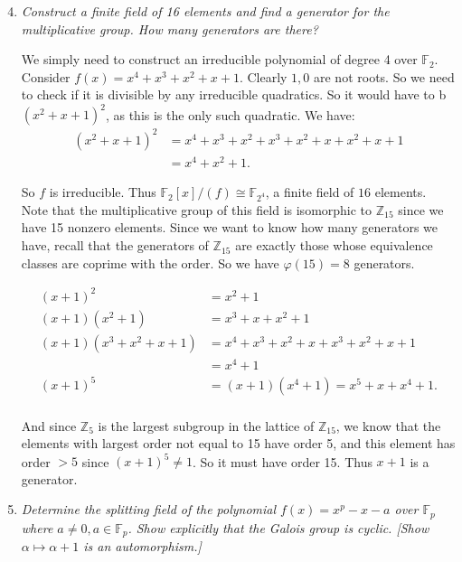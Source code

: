 \documentclass[9pt,reqno,twoside]{amsbook}
\theoremstyle{plain}
\numberwithin{section}{chapter}
\numberwithin{equation}{chapter}
\theoremstyle{definition}
\theoremstyle{remark}
\theoremstyle{plain}
\newcommand{\z}{\mathbb{Z}}
\newcommand{\F}{\mathbb{F}}
\newcommand{\bee}{\begin{equation}\begin{aligned}}
\newcommand{\eee}{\end{aligned}\end{equation}}
\newcommand{\counter}{\setcounter}
\renewcommand{\phi}{\varphi}
\begin{document}
\begin{enumerate}[label=\arabic*.]
\counter{enumi}{3}

\item \textit{Construct a finite field of 16 elements and find a generator for the multiplicative group. How many generators are there?}

We simply need to construct an irreducible polynomial of degree 4 over $\F_2$. Consider $f(x) = x^4 + x^3 + x^2 + x + 1$. Clearly $1,0$ are not roots. So we need to check if it is divisible by any irreducible quadratics. So it would have to b $(x^2 + x + 1)^2$, as this is the only such quadratic. We have:
\bee
(x^2 + x + 1)^2 &= x^4 + x^3 + x^2 + x^3 + x^2 + x + x^2 + x + 1\\
&= x^4 + x^2 + 1.
\eee

So $f$ is irreducible. Thus $\F_2[x]/(f) \cong \F_{2^4}$, a finite field of $16$ elements. Note that the multiplicative group of this field is isomorphic to $\z_{15}$ since we have 15 nonzero elements. Since we want to know how many generators we have, recall that the generators of $\z_{15}$ are exactly those whose equivalence classes are coprime with the order. So we have $\phi(15) = 8$ generators. 

\bee
(x + 1)^2 &= x^2 + 1\\
(x + 1)(x^2 + 1) &= x^3 + x + x^2 + 1\\
(x + 1)(x^3 + x^2 + x + 1) &= x^4 + x^3 + x^2 + x + x^3 + x^2 + x + 1\\
&= x^4 + 1\\
(x + 1)^5 &= (x + 1)(x^4 + 1) = x^5 + x + x^4 + 1.\\
\eee

And since $\z_5$ is the largest subgroup in the lattice of $\z_15$, we know that the elements with largest order not equal to 15 have order 5, and this element has order $> 5$ since $(x + 1)^5 \neq 1$. So it must have order 15. Thus $x + 1$ is a generator. 


\counter{enumi}{7}

\item \textit{Determine the splitting field of the polynomial $f(x) = x^p - x - a$ over $\F_p$ where $a \neq 0,a \in \F_p$. Show explicitly that the Galois group is cyclic. [Show $\alpha \mapsto \alpha + 1$ is an automorphism.]}


\end{enumerate}
\end{document}
